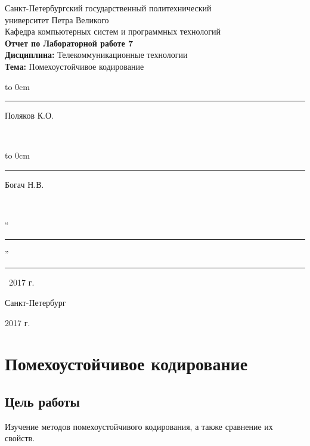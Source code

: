 \documentclass[12pt,a4paper]{article}
\begin{document}
	\begin{titlepage}
		\begin{center}
			Санкт-Петербургский государственный политехнический \\ университет Петра Великого \\[0.1cm]
			Кафедра компьютерных систем и программных технологий \\[9cm]
			
			\textbf{Отчет по Лабораторной работе 7}\\[0.1cm]
			\textbf{Дисциплина:} Телекоммуникационные технологии \\[0.1cm]
			\textbf{Тема:} Помехоустойчивое кодирование
		\end{center}
		
		\vfill
		
		 \hfill\parbox{8cm}{
			\hspace*{3cm}\hbox to 0cm{}\hspace*{-0.8cm}\rule{3cm}{0.8pt} Поляков К.О.}\\[0.6cm]
		
		 \hfill\parbox{8cm}{
			\hspace*{3cm}\hbox to 0cm{}\hspace*{-0.8cm}\rule{3cm}{0.8pt} Богач Н.В.}\\[0.6cm]
		
		\hfill\parbox{9cm}{\hspace*{3cm}``\rule{0.7cm}{0.8pt}''\rule{3cm}{0.8pt}~2017 г.}
		
		\vfill
		
		\begin{center}
			Санкт-Петербург \par
			2017 г.
		\end{center}
	\end{titlepage}
\newpage

\section{Помехоустойчивое кодирование}

\subsection{Цель работы}

  Изучение методов помехоустойчивого кодирования, а также сравнение их свойств.
\end{document}
